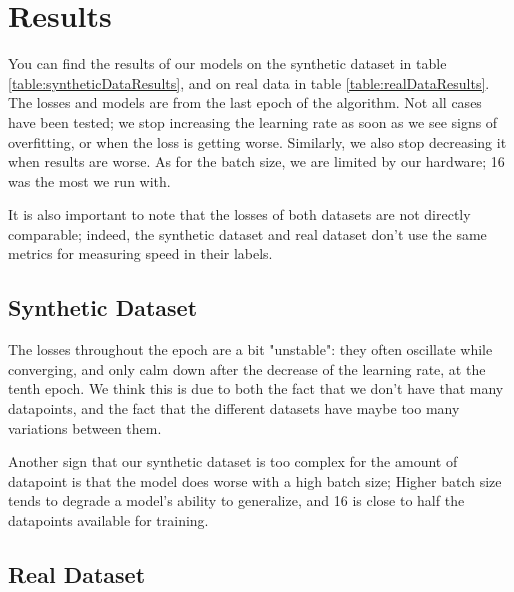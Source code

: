 \documentclass[10pt,conference]{IEEEtran}
\begin{document}
\section{Results}
You can find the results of our models on the synthetic dataset in table \ref{table:syntheticDataResults}, and on real data in table \ref{table:realDataResults}. The losses and models are from the last epoch of the algorithm. Not all cases have been tested; we stop increasing the learning rate as soon as we see signs of overfitting, or when the loss is getting worse. Similarly, we also stop decreasing it when results are worse. As for the batch size, we are limited by our hardware; 16 was the most we run with.\par
It is also important to note that the losses of both datasets are not directly comparable; indeed, the synthetic dataset and real dataset don't use the same metrics for measuring speed in their labels.\par

\subsection{Synthetic Dataset}
The losses throughout the epoch are a bit "unstable": they often oscillate while converging, and only calm down after the decrease of the learning rate, at the tenth epoch. We think this is due to both the fact that we don't have that many datapoints, and the fact that the different datasets have maybe too many variations between them.\par
Another sign that our synthetic dataset is too complex for the amount of datapoint is that the model does worse with a high batch size; Higher batch size tends to degrade a model's ability to generalize, and 16 is close to half the datapoints available for training.
\subsection{Real Dataset}

\end{document}
